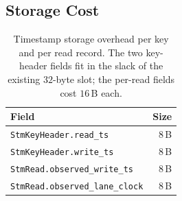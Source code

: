 \subsection{Storage Cost}

\begin{table}[ht]
\centering
\begin{tabular}{@{}lr@{}}
\toprule
\textbf{Field} & \textbf{Size} \\
\midrule
\texttt{StmKeyHeader.read\_ts}      & 8\,B \\
\texttt{StmKeyHeader.write\_ts}     & 8\,B \\
\texttt{StmRead.observed\_write\_ts}& 8\,B \\
\texttt{StmRead.observed\_lane\_clock} & 8\,B \\
\bottomrule
\end{tabular}
\caption{Timestamp storage overhead per key and per read record.
The two key-header fields fit in the slack of the existing
$32$-byte slot; the per-read fields cost $16$\,B each.}
\label{tab:ts-storage}
\end{table}


